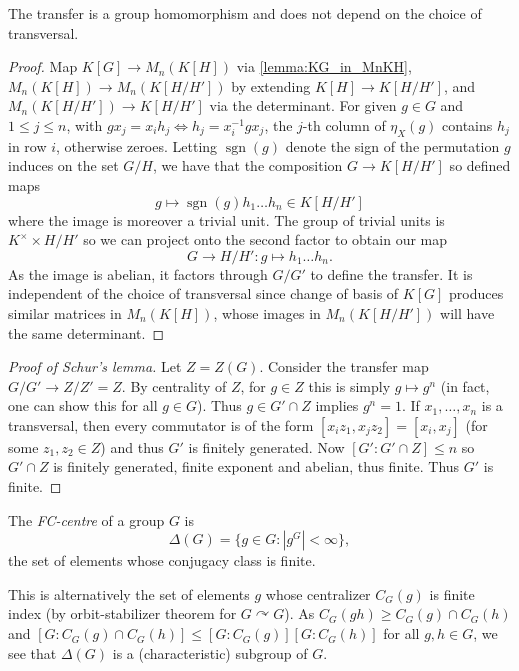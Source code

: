 \begin{lemma}
    The transfer is a group homomorphism and does not depend on the choice of transversal.
\end{lemma}

\begin{proof}
    Map $K[G] \to M_n(K[H])$ via \cref{lemma:KG_in_MnKH}, $M_n(K[H]) \to M_n(K[H/H'])$ by extending $K[H] \to K[H/H']$, and $M_n(K[H/H']) \to K[H/H']$ via the determinant.
    For given $g \in G$ and $1 \leq j \leq n$, with $g x_j = x_i h_j \Leftrightarrow h_j = x_i^{-1} g x_j$, the $j$-th column of $\eta_X(g)$ contains $h_j$ in row $i$, otherwise zeroes.
    Letting $\operatorname{sgn}(g)$ denote the sign of the permutation $g$ induces on the set $G / H$, we have that the composition $G \to K[H/H']$ so defined maps \[
        g \mapsto \operatorname{sgn}(g) h_1 \dots h_n \in K[H / H']
    \]
    where the image is moreover a trivial unit.
    The group of trivial units is $K^\times \times H / H'$ so we can project onto the second factor to obtain our map \[
        G \to H / H' \colon g \mapsto h_1 \dots h_n.
    \]
    As the image is abelian, it factors through $G/G'$ to define the transfer.
    It is independent of the choice of transversal since change of basis of $K[G]$ produces similar matrices in $M_n(K[H])$, whose images in $M_n(K[H/H'])$ will have the same determinant.

\end{proof}

\begin{proof}[Proof of Schur's lemma]
    Let $Z = Z(G)$.
    Consider the transfer map $G / G' \to Z / Z' = Z$.
    By centrality of $Z$, for $g \in Z$ this is simply $g \mapsto g^n$ (in fact, one can show this for all $g \in G$).
    Thus $g \in G' \cap Z$ implies $g^n = 1$.
    If $x_1, \dots, x_n$ is a transversal, then every commutator is of the form $[x_i z_1, x_j z_2] = [x_i, x_j]$ (for some $z_1, z_2 \in Z$) and thus $G'$ is finitely generated.
    Now $[G' : G' \cap Z] \leq n$ so $G' \cap Z$ is finitely generated, finite exponent and abelian, thus finite.
    Thus $G'$ is finite.
\end{proof}

\begin{definition}
    The \emph{FC-centre} of a group $G$ is \[
        \Delta(G) = \{ g \in G : |g^G| < \infty \},
    \] the set of elements whose conjugacy class is finite.
\end{definition}

This is alternatively the set of elements $g$ whose centralizer $C_G(g)$ is finite index (by orbit-stabilizer theorem for $G \curvearrowright G$).
As $C_G(gh) \geq C_G(g) \cap C_G(h)$ and $[G : C_G(g) \cap C_G(h)] \leq [G : C_G(g)] [G : C_G(h)]$ for all $g, h \in G$, we see that $\Delta(G)$ is a (characteristic) subgroup of $G$.


